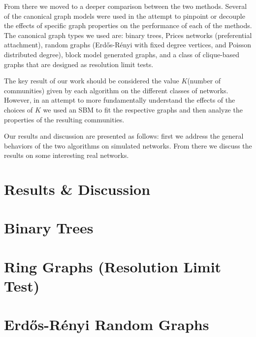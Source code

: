 \documentclass[twocolumn,twoside]{IEEEtran}
\begin{document}
\begin{itemize}
From there we moved to a deeper comparison between the two methods. Several of
the canonical graph models were used in the attempt to pinpoint or decouple
the effects of specific graph properties on the performance of each of the
methods. The canonical graph types we used are: binary trees, Prices networks
(preferential attachment), random graphs (Erd\H{o}s-R\'{e}nyi with fixed degree
vertices, and Poisson distributed degree), block model generated graphs, and a
class of clique-based graphs that are designed as resolution limit tests.

The key result of our work should be considered the value $K$(number of
communities) given by each algorithm on the different classes of networks. However, in an attempt to more
fundamentally understand the effects of the choices of $K$ we used an SBM to
fit the respective graphs and then analyze the properties of the resulting
communities.

Our results and discussion are presented as follows: first we address the
general behaviors of the two algorithms on simulated networks. From there we
discuss the results on some interesting real networks.

\section*{Results \& Discussion}\label{sec:RD}



%
% 
%
%
%   

\newcommand{\inputsamepage}[1] {
    \begin{minipage}{\linewidth}
        
    \end{minipage}
}


\break
\section*{Binary Trees}


\break
\section*{Ring Graphs (Resolution Limit Test)}


\break
\section*{Erd\H{o}s-R\'{e}nyi Random Graphs}



\end{itemize}
\end{document}
